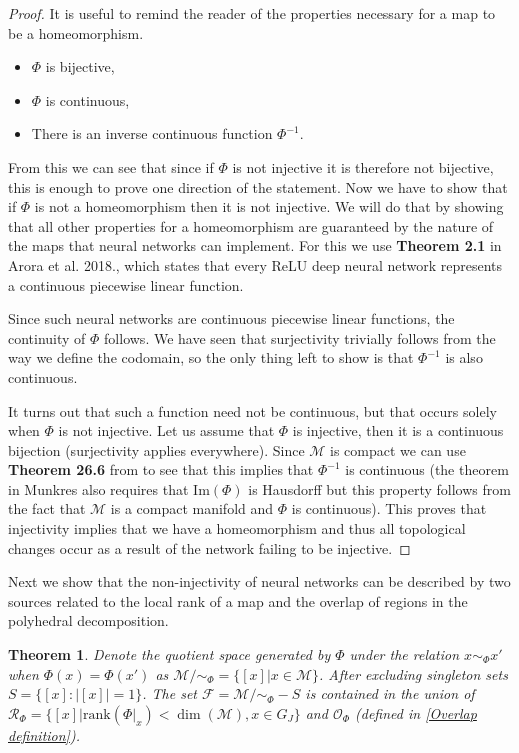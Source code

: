 \documentclass[10pt]{article} %
\theoremstyle{plain}
\newtheorem{theorem}{Theorem}[section]
\theoremstyle{definition}
\theoremstyle{remark}
\begin{document}
\begin{proof}
    It is useful to remind the reader of the properties necessary for a map to be a homeomorphism. 
    \begin{itemize}
        \item $\Phi$ is bijective,
        \item $\Phi$ is continuous,
        \item There is an inverse continuous function $\Phi^{-1}$.
    \end{itemize}

    From this we can see that since if $\Phi$ is not injective it is therefore not bijective, this is enough to prove one direction of the statement. Now we have to show that if $\Phi$ is not a homeomorphism then it is not injective. We will do that by showing that all other properties for a homeomorphism are guaranteed by the nature of the maps that neural networks can implement. For this we use \textbf{Theorem 2.1} in Arora et al. 2018., which states that every ReLU deep neural network represents a continuous piecewise linear function.

    Since such neural networks are continuous piecewise linear functions, the continuity of $\Phi$ follows. We have seen that surjectivity trivially follows from the way we define the codomain, so the only thing left to show is that $\Phi^{-1}$ is also continuous.

    It turns out that such a function need not be continuous, but that occurs solely when $\Phi$ is not injective. Let us assume that $\Phi$ is injective, then it is a continuous bijection (surjectivity applies everywhere). Since $\mathcal{M}$ is compact we can use \textbf{Theorem 26.6} from \citet{munkres200} to see that this implies that $\Phi^{-1}$ is continuous (the theorem in Munkres also requires that $\text{Im}(\Phi)$ is Hausdorff but this property follows from the fact that $\mathcal{M}$ is a compact manifold and $\Phi$ is continuous). This proves that injectivity implies that we have a homeomorphism and thus all topological changes occur as a result of the network failing to be injective.
\end{proof}

Next we show that the non-injectivity of neural networks can be described by two sources related to the local rank of a map and the overlap of regions in the polyhedral decomposition.

\begin{theorem}
    Denote the {quotient space generated by $\Phi$ under the relation $x\sim_\Phi x'$ when $\Phi(x)=\Phi(x')$ as $\mathcal{M}/\sim_\Phi = \{[x] | x\in\mathcal{M}\}$. After excluding singleton sets $S = \{[x]:|[x]|=1\}$. The set $\mathcal{F}=\mathcal{M}/\sim_\Phi-S$} is contained in the union of $\mathcal{R}_\Phi = \{[x] | \text{rank}(\Phi|_x) < \dim(\mathcal{M}), x \in G_J\}$ and $\mathcal{O}_\Phi$ (defined in \ref{Overlap definition}).
    \label{Theorem: two sources}
\end{theorem}
\end{document}
